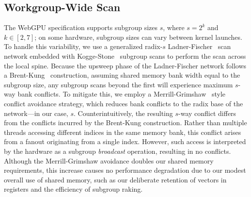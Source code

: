 \documentclass[acmsmall, manuscript, screen, review, anonymous]{acmart}
\begin{document}
\subsection{Workgroup-Wide Scan}
The WebGPU specification supports subgroup sizes $s$, where $s = 2^k$ and $k \in [2, 7]$; on some hardware, subgroup sizes can vary between kernel launches. To handle this variability, we use a generalized radix-$s$ Ladner-Fischer~\cite{10.1145/322217.322232} scan network embedded with Kogge-Stone~\cite{5009159} subgroup scans to perform the scan across the local spine. Because the upsweep phase of the Ladner-Fischer network follows a Brent-Kung~\cite{1675982} construction, assuming shared memory bank width equal to the subgroup size, any subgroup scans beyond the first will experience maximum $s$-way bank conflicts. To mitigate this, we employ a Merrill-Grimshaw~\cite[Section 3.3.5]{Merrill2009} style conflict avoidance strategy, which reduces bank conflicts to the radix base of the network—in our case, $s$. Counterintuitively, the resulting $s$-way conflict differs from the conflicts incurred by the Brent-Kung construction. Rather than multiple threads accessing different indices in the same memory bank, this conflict arises from a fanout originating from a single index. However, such access is interpreted by the hardware as a subgroup \emph{broadcast} operation, resulting in no conflicts. Although the Merrill-Grimshaw avoidance doubles our shared memory requirements, this increase causes no performance degradation due to our modest overall use of shared memory, such as our deliberate retention of vectors in registers and the efficiency of subgroup raking. 
\end{document}
